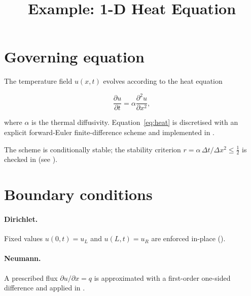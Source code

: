 \documentclass{article}
\title{Example: 1-D Heat Equation}
\author{}
\date{}
\begin{document}
\maketitle

\section{Governing equation}

The temperature field $u(x,t)$ evolves according to the heat equation

\begin{equation}
  \frac{\partial u}{\partial t} = \alpha \frac{\partial^2 u}{\partial x^2},
  \label{eq:heat}
\end{equation}

where $\alpha$ is the thermal diffusivity.
Equation~\eqref{eq:heat} is discretised with an explicit forward-Euler
finite-difference scheme and implemented in .

The scheme is conditionally stable; the stability criterion
$r = \alpha\,\Delta t / \Delta x^2 \leq \tfrac{1}{2}$
is checked in 
(see ).

\section{Boundary conditions}

\paragraph{Dirichlet.}
Fixed values $u(0,t)=u_L$ and $u(L,t)=u_R$ are enforced in-place
().

\paragraph{Neumann.}
A prescribed flux $\partial u/\partial x = q$ is approximated with a
first-order one-sided difference and applied in
.
\end{document}
